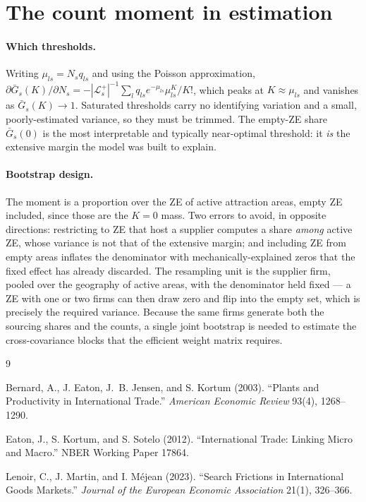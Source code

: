 \documentclass[11pt]{article}
\begin{document}
\section{The count moment in estimation}
\label{app:count}

\paragraph{Which thresholds.} Writing $\mu_{ls}=N_{s}q_{ls}$ and using the Poisson approximation,
$\partial\bar G_{s}(K)/\partial N_{s}=-|\mathcal{L}^{+}_{s}|^{-1}\sum_{l}q_{ls}e^{-\mu_{ls}}\mu_{ls}^{K}/K!$,
which peaks at $K\approx\mu_{ls}$ and vanishes as $\bar G_{s}(K)\to1$. Saturated thresholds carry
no identifying variation and a small, poorly-estimated variance, so they must be trimmed. The
empty-ZE share $\bar G_{s}(0)$ is the most interpretable and typically near-optimal threshold: it
\emph{is} the extensive margin the model was built to explain.

\paragraph{Bootstrap design.} The moment is a proportion over the ZE of active attraction areas,
empty ZE included, since those are the $K=0$ mass. Two errors to avoid, in opposite directions:
restricting to ZE that host a supplier computes a share \emph{among} active ZE, whose variance is
not that of the extensive margin; and including ZE from empty areas inflates the denominator with
mechanically-explained zeros that the fixed effect has already discarded. The resampling unit is
the supplier firm, pooled over the geography of active areas, with the denominator held fixed --- a
ZE with one or two firms can then draw zero and flip into the empty set, which is precisely the
required variance. Because the same firms generate both the sourcing shares and the counts, a
single joint bootstrap is needed to estimate the cross-covariance blocks that the efficient weight
matrix requires.

\begin{thebibliography}{9}

Bernard, A., J. Eaton, J.~B. Jensen, and S. Kortum (2003).
``Plants and Productivity in International Trade.'' \emph{American Economic Review} 93(4), 1268--1290.

Eaton, J., S. Kortum, and S. Sotelo (2012).
``International Trade: Linking Micro and Macro.'' NBER Working Paper 17864.

Lenoir, C., J. Martin, and I. M\'ejean (2023).
``Search Frictions in International Goods Markets.'' \emph{Journal of the European Economic
Association} 21(1), 326--366.

\end{thebibliography}
\end{document}
